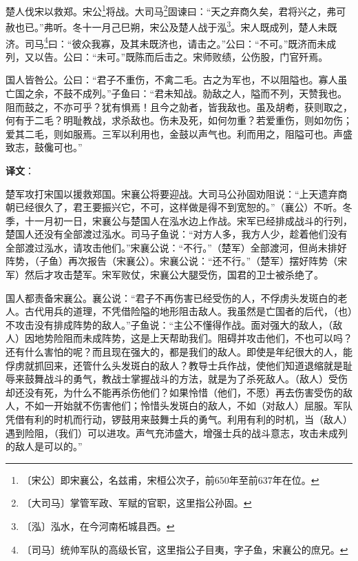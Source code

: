 \documentclass[12pt,UTF-8,openany,a4]{ctexbook}
\begin{document}
\begin{large}
    
    楚人伐宋以救郑。宋公\footnote{〔宋公〕\yiwen 即宋襄公，名兹甫，宋桓公次子，前650年至前637年在位。}将战。大司马\footnote{〔大司马〕\yiwen 掌管军政、军赋的官职，这里指公孙固。}固谏曰：“天之弃商久矣，君将兴之，弗可赦也已。”弗听。冬十一月己巳朔，宋公及楚人战于泓\footnote{〔泓〕\yiwen \yiwen 泓水，在今河南柘城县西。}。宋人既成列，楚人未既济。司马\footnote{〔司马〕\yiwen 统帅军队的高级长官，这里指公子目夷，字子鱼，宋襄公的庶兄。}曰：“彼众我寡，及其未既济也，请击之。”公曰：“不可。”既济而未成列，又以告。公曰：“未可。”既陈而后击之。宋师败绩，公伤股，门官歼焉。
    
    国人皆咎公。公曰：“君子不重伤，不禽二毛。古之为军也，不以阻隘也。寡人虽亡国之余，不鼓不成列。”子鱼曰：“君未知战。勍敌之人，隘而不列，天赞我也。阻而鼓之，不亦可乎？犹有惧焉！且今之勍者，皆我敌也。虽及胡耇，获则取之，何有于二毛？明耻教战，求杀敌也。伤未及死，如何勿重？若爱重伤，则如勿伤；爱其二毛，则如服焉。三军以利用也，金鼓以声气也。利而用之，阻隘可也。声盛致志，鼓儳可也。”
\end{large}


\newpage

\begin{Large}
   \noindent \textbf{译文}：
\end{Large}

\vspace{1em}

\begin{large}
    \yiwen 
    楚军攻打宋国以援救郑国。宋襄公将要迎战。大司马公孙固劝阻说：“上天遗弃商朝已经很久了，君王要振兴它，不可，这样做是得不到宽恕的。”（襄公）不听。冬季，十一月初一日，宋襄公与楚国人在泓水边上作战。宋军已经排成战斗的行列，楚国人还没有全部渡过泓水。司马子鱼说：“对方人多，我方人少，趁着他们没有全部渡过泓水，请攻击他们。”宋襄公说：“不行。”（楚军）全部渡河，但尚未排好阵势，（子鱼）再次报告（宋襄公）。宋襄公说：“还不行。”（楚军）摆好阵势（宋军）然后才攻击楚军。宋军败仗，宋襄公大腿受伤，国君的卫士被杀绝了。
    
    国人都责备宋襄公。襄公说：“君子不再伤害已经受伤的人，不俘虏头发斑白的老人。古代用兵的道理，不凭借险隘的地形阻击敌人。我虽然是亡国者的后代，（也）不攻击没有排成阵势的敌人。”子鱼说：“主公不懂得作战。面对强大的敌人，（敌人）因地势险阻而未成阵势，这是上天帮助我们。阻碍并攻击他们，不也可以吗？还有什么害怕的呢？而且现在强大的，都是我们的敌人。即使是年纪很大的人，能俘虏就抓回来，还管什么头发斑白的敌人？教导士兵作战，使他们知道退缩就是耻辱来鼓舞战斗的勇气，教战士掌握战斗的方法，就是为了杀死敌人。（敌人）受伤却还没有死，为什么不能再杀伤他们？如果怜惜（他们，不愿）再去伤害受伤的敌人，不如一开始就不伤害他们；怜惜头发斑白的敌人，不如（对敌人）屈服。军队凭借有利的时机而行动，锣鼓用来鼓舞士兵的勇气。利用有利的时机，当（敌人）遇到险阻，（我们）可以进攻。声气充沛盛大，增强士兵的战斗意志，攻击未成列的敌人是可以的。”
    
\end{large}
\end{document}
